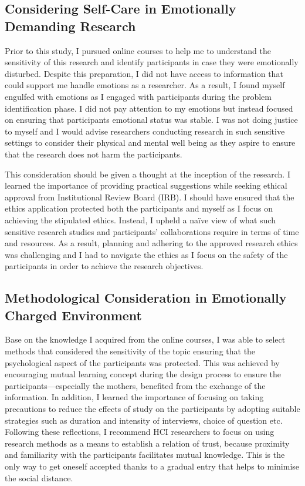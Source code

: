 \subsection{Considering Self-Care in Emotionally Demanding Research}
Prior to this study, I pursued online courses to help me to understand the sensitivity of this research and identify participants in case they were emotionally disturbed. Despite this preparation, I did not have access to information that could support me handle emotions as a researcher. As a result, I found myself engulfed with emotions as I engaged with participants during the problem identification phase. I did not pay attention to my emotions but instead focused on ensuring that participants emotional status was stable. I was not doing justice to myself and I would advise researchers conducting research in such sensitive settings to consider their physical and mental well being as they aspire to ensure that the research does not harm the participants. 
 
This consideration should be given a thought at the inception of the research. I learned the importance of providing practical suggestions while seeking ethical approval from Institutional Review  Board (IRB). I should have ensured that the ethics application protected both the participants and myself as I focus on achieving the stipulated  ethics. Instead, I upheld a naïve view of what such sensitive research studies and participants' collaborations require in terms of time and resources. As a result, planning and adhering to the approved  research ethics was challenging and I had to navigate the ethics as I focus on the  safety of the participants in order to achieve the research objectives.

\subsection{Methodological Consideration in Emotionally Charged Environment}
Base on the knowledge I acquired from the online courses, I was able to select methods that considered the sensitivity of the topic ensuring that the psychological aspect of the participants was protected. This was achieved by encouraging mutual learning concept during the design process to ensure the participants---especially the mothers, benefited from the exchange of the information. In addition, I learned the importance of focusing on taking precautions to reduce the effects of study on the participants by adopting suitable strategies such as duration and intensity of interviews, choice of question etc. Following these reflections, I recommend HCI researchers to focus on using research methods as a means to establish a relation of trust, because proximity and familiarity with the participants facilitates mutual knowledge. This is the only way to get oneself accepted thanks to a gradual entry that helps to minimise the social distance.

